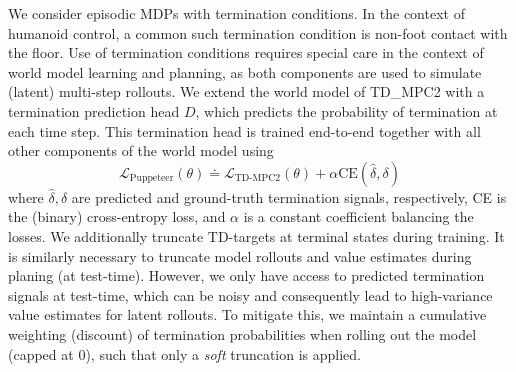\documentclass[sn-mathphys-num]{sn-jnl}%
\theoremstyle{thmstyleone}%
\theoremstyle{thmstyletwo}%
\theoremstyle{thmstylethree}%
\begin{document}
We consider episodic MDPs with termination conditions.
In the context of humanoid control, a common such termination condition is non-foot contact with the floor.
Use of termination conditions requires special care in the context of world model learning and planning, as both components are used to simulate (latent) multi-step rollouts.
We extend the world model of TD\_MPC2 with a termination prediction head $ D $, which predicts the probability of termination at each time step.
This termination head is trained end-to-end together with all other components of the world model using
\begin{equation}\label{eq:trained_termination}
	\mathcal{L}_\text{Puppeteer}(\theta)
		\doteq
		\mathcal{L}_\text{TD-MPC2} (\theta) + 
		\alpha \text{CE} (\hat{\delta}, \delta)
\end{equation}
%
where $ \hat{\delta}, \delta $ are predicted and ground-truth termination signals, respectively, CE is the (binary) cross-entropy loss, and $ \alpha $ is a constant coefficient balancing the losses.
We additionally truncate TD-targets at terminal states during training.
It is similarly necessary to truncate model rollouts and value estimates during planing (at test-time).
However, we only have access to predicted termination signals at test-time, which can be noisy and consequently lead to high-variance value estimates for latent rollouts.
To mitigate this, we maintain a cumulative weighting (discount) of termination probabilities when rolling out the model (capped at 0), such that only a \textit{soft} truncation is applied.
\end{document}
